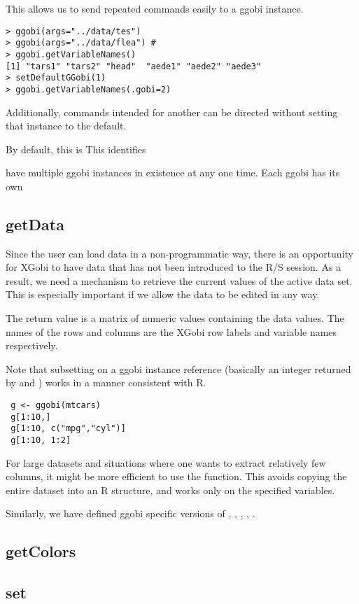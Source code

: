 \documentclass{article}
\begin{document}
This allows us to send repeated commands easily to a ggobi instance.
\begin{verbatim}
> ggobi(args="../data/tes") 
> ggobi(args="../data/flea") #
> ggobi.getVariableNames()
[1] "tars1" "tars2" "head"  "aede1" "aede2" "aede3"
> setDefaultGGobi(1)
> ggobi.getVariableNames(.gobi=2)
\end{verbatim}
Additionally, commands intended for another can be directed without
setting that instance to the default.

By default, this is 
This identifies 


have multiple ggobi
instances in existence at any one time.
Each ggobi has its own


\subsection{getData}
Since the user can load data in a non-programmatic way, there is an
opportunity for XGobi to have data that has not been introduced to the
R/S session.  As a result, we need a mechanism to retrieve the current
values of the active data set.  This is especially important if we
allow the data to be edited in any way.

The return value is a matrix of numeric values containing the data
values.  The names of the rows and columns are the XGobi row labels
and variable names respectively.

Note that subsetting on a ggobi instance reference (basically an
integer returned by  and )
works in a manner consistent with R.
\begin{verbatim}
 g <- ggobi(mtcars)
 g[1:10,]
 g[1:10, c("mpg","cyl")]
 g[1:10, 1:2]
\end{verbatim}
For large datasets and situations where one wants to extract
relatively few columns, it might be more efficient to use the
 function.
This avoids copying the entire dataset into an R structure,
and works only on the specified variables.

Similarly, we have defined ggobi specific
versions of , ,
, ,
.


\subsection{getColors}


\subsection{set}
\end{document}
